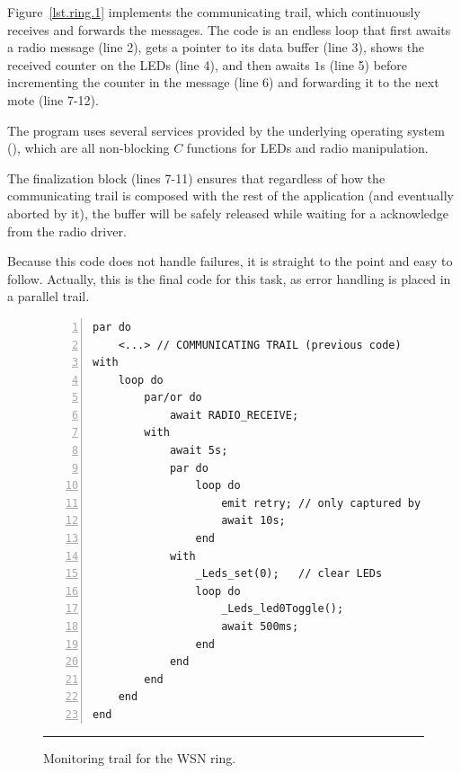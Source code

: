 Figure~\ref{lst.ring.1} implements the communicating trail, which continuously 
receives and forwards the messages.
%
The code is an endless loop that first awaits a radio message (line 2), gets a 
pointer to its data buffer (line 3), shows the received counter on the LEDs 
(line 4), and then awaits $1$s (line 5) before incrementing the counter in the 
message (line 6) and forwarding it to the next mote (line 7-12).

The program uses several services provided by the underlying operating system 
(\cite{wsn.tos}), which are all non-blocking $C$ functions for LEDs and radio 
manipulation.

The finalization block (lines 7-11) ensures that regardless of how the 
communicating trail is composed with the rest of the application (and 
eventually aborted by it), the  buffer will be safely released while 
waiting for a  acknowledge from the radio driver.

Because this code does not handle failures, it is straight to the point and 
easy to follow.
Actually, this is the final code for this task, as error handling is placed in 
a parallel trail.

\begin{figure}[ht]
\begin{lstlisting}[numbers=left,xleftmargin=2em]
par do
    <...> // COMMUNICATING TRAIL (previous code)
with
    loop do
        par/or do
            await RADIO_RECEIVE;
        with
            await 5s;
            par do
                loop do
                    emit retry; // only captured by mote 0
                    await 10s;
                end
            with
                _Leds_set(0);   // clear LEDs
                loop do
                    _Leds_led0Toggle();
                    await 500ms;
                end
            end
        end
    end
end
\end{lstlisting}
\rule{14cm}{0.37pt}
\caption{ Monitoring trail for the WSN ring.%
{\small %
}%
\label{lst.ring.2}
}
\end{figure}

